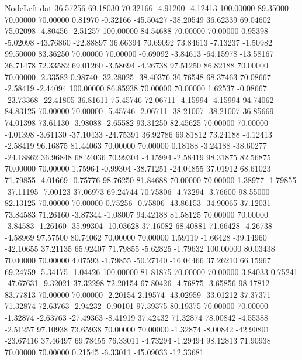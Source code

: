 \begin{filecontents}{NodeLeft.dat}
  36.57256   69.18030   70.32166    -4.91200   -4.12413  100.00000   89.35000   70.00000   70.00000    0.81970   -0.32166  -45.50427  -38.20549
  36.62339   69.04602   75.02098    -4.80456   -2.51257  100.00000   84.54688   70.00000   70.00000    0.95398   -5.02098  -43.76860  -22.88897
  36.66394   70.69092   73.84613    -7.13237   -1.50982   99.50000   83.36250   70.00000   70.00000   -0.69092   -3.84613  -64.15978  -13.58167
  36.71478   72.33582   69.01260    -3.58694   -4.26738   97.51250   86.82188   70.00000   70.00000   -2.33582    0.98740  -32.28025  -38.40376
  36.76548   68.37463   70.08667    -2.58419   -2.44094  100.00000   86.85938   70.00000   70.00000    1.62537   -0.08667  -23.73368  -22.41805
  36.81611   75.45746   72.06711    -4.15994   -4.15994   94.74062   84.83125   70.00000   70.00000   -5.45746   -2.06711  -38.21007  -38.21007
  36.85669   74.01398   73.61130    -3.98088   -2.65582   93.31250   82.45625   70.00000   70.00000   -4.01398   -3.61130  -37.10433  -24.75391
  36.92786   69.81812   73.24188    -4.12413   -2.58419   96.16875   81.44063   70.00000   70.00000    0.18188   -3.24188  -38.60277  -24.18862
  36.96848   68.24036   70.99304    -4.15994   -2.58419   98.31875   82.56875   70.00000   70.00000    1.75964   -0.99304  -38.71251  -24.04855
  37.01912   68.61023   71.79855    -4.01669   -0.75776   98.76250   81.84688   70.00000   70.00000    1.38977   -1.79855  -37.11195   -7.00123
  37.06973   69.24744   70.75806    -4.73294   -3.76600   98.55000   82.13125   70.00000   70.00000    0.75256   -0.75806  -43.86153  -34.90065
  37.12031   73.84583   71.26160    -3.87344   -1.08007   94.42188   81.58125   70.00000   70.00000   -3.84583   -1.26160  -35.99304  -10.03628
  37.16082   68.40881   71.66428    -4.26738   -4.58969   97.57500   80.74062   70.00000   70.00000    1.59119   -1.66428  -39.14960  -42.10655
  37.21135   65.92407   71.79855    -5.62825   -1.79632  100.00000   80.03438   70.00000   70.00000    4.07593   -1.79855  -50.27140  -16.04466
  37.26210   66.15967   69.24759    -5.34175   -1.04426  100.00000   81.81875   70.00000   70.00000    3.84033    0.75241  -47.67631   -9.32021
  37.32298   72.20154   67.80426    -4.76875   -3.65856   98.17812   83.77813   70.00000   70.00000   -2.20154    2.19574  -43.02959  -33.01212
  37.37371   71.32874   72.63763    -2.94232   -0.90101   97.39375   80.19375   70.00000   70.00000   -1.32874   -2.63763  -27.49363   -8.41919
  37.42432   71.32874   78.00842    -4.55388   -2.51257   97.10938   73.65938   70.00000   70.00000   -1.32874   -8.00842  -42.90801  -23.67416
  37.46497   69.78455   76.33011    -4.73294   -1.29494   98.12813   71.90938   70.00000   70.00000    0.21545   -6.33011  -45.09033  -12.33681

\end{filecontents}
